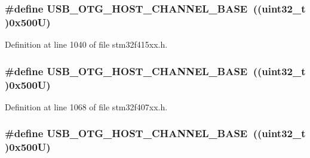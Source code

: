 \subsubsection[{\texorpdfstring{U\+S\+B\+\_\+\+O\+T\+G\+\_\+\+H\+O\+S\+T\+\_\+\+C\+H\+A\+N\+N\+E\+L\+\_\+\+B\+A\+SE}{USB_OTG_HOST_CHANNEL_BASE}}]{\setlength{\rightskip}{0pt plus 5cm}\#define U\+S\+B\+\_\+\+O\+T\+G\+\_\+\+H\+O\+S\+T\+\_\+\+C\+H\+A\+N\+N\+E\+L\+\_\+\+B\+A\+SE~((uint32\+\_\+t )0x500\+U)}\hypertarget{group___peripheral__registers__structures_ga942c8c5241b80fbcf638fea0fa18bebd}{}\label{group___peripheral__registers__structures_ga942c8c5241b80fbcf638fea0fa18bebd}


Definition at line 1040 of file stm32f415xx.\+h.

\subsubsection[{\texorpdfstring{U\+S\+B\+\_\+\+O\+T\+G\+\_\+\+H\+O\+S\+T\+\_\+\+C\+H\+A\+N\+N\+E\+L\+\_\+\+B\+A\+SE}{USB_OTG_HOST_CHANNEL_BASE}}]{\setlength{\rightskip}{0pt plus 5cm}\#define U\+S\+B\+\_\+\+O\+T\+G\+\_\+\+H\+O\+S\+T\+\_\+\+C\+H\+A\+N\+N\+E\+L\+\_\+\+B\+A\+SE~((uint32\+\_\+t )0x500\+U)}\hypertarget{group___peripheral__registers__structures_ga942c8c5241b80fbcf638fea0fa18bebd}{}\label{group___peripheral__registers__structures_ga942c8c5241b80fbcf638fea0fa18bebd}


Definition at line 1068 of file stm32f407xx.\+h.

\subsubsection[{\texorpdfstring{U\+S\+B\+\_\+\+O\+T\+G\+\_\+\+H\+O\+S\+T\+\_\+\+C\+H\+A\+N\+N\+E\+L\+\_\+\+B\+A\+SE}{USB_OTG_HOST_CHANNEL_BASE}}]{\setlength{\rightskip}{0pt plus 5cm}\#define U\+S\+B\+\_\+\+O\+T\+G\+\_\+\+H\+O\+S\+T\+\_\+\+C\+H\+A\+N\+N\+E\+L\+\_\+\+B\+A\+SE~((uint32\+\_\+t )0x500\+U)}\hypertarget{group___peripheral__registers__structures_ga942c8c5241b80fbcf638fea0fa18bebd}{}\label{group___peripheral__registers__structures_ga942c8c5241b80fbcf638fea0fa18bebd}


